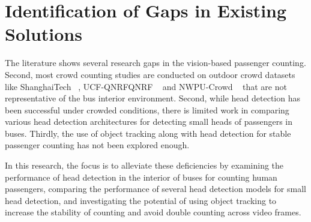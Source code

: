 \section{Identification of Gaps in Existing Solutions}

The literature shows several research gaps in the vision-based passenger counting. Second, most crowd counting studies are conducted on outdoor crowd datasets like ShanghaiTech ~\cite{Zhu2020}, UCF-QNRFQNRF ~\cite{ucf_qnrf_dataset} and NWPU-Crowd ~\cite{wang2020nwpu} that are not representative of the bus interior environment. Second, while head detection has been successful under crowded conditions, there is limited work in comparing various head detection architectures for detecting small heads of passengers in buses. Thirdly, the use of object tracking along with head detection for stable passenger counting has not been explored enough.

In this research, the focus is to alleviate these deficiencies by examining the performance of head detection in the interior of buses for counting human passengers, comparing the performance of several head detection models for small head detection, and investigating the potential of using object tracking to increase the stability of counting and avoid double counting across video frames.